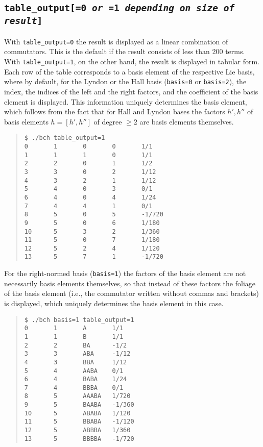 \documentclass[11pt,a4paper]{article}
\begin{document}
\subsection*{\tt table\_output[=0 {\em or} =1 {\em depending on size of result}]}
With \verb|table_output=0| the result is displayed as a linear combination of commutators. 
This is the default if the result consists of less than 200 terms.
With
\verb|table_output=1|, on the other hand, the result is displayed in tabular form.
Each row of the table corresponds to a basis element of the respective Lie basis,
where by default, for the Lyndon or the Hall
basis (\verb|basis=0| or \verb|basis=2|),
the index, the indices of the left and
the right factors, and the coefficient of the basis element is displayed. 
This information uniquely determines the basis element, which follows from the
fact that 
for Hall and Lyndon bases the factors $h', h''$ of basis elements $h=[h',h'']$ of degree $\geq 2$ are
basis elements themselves.
\begin{quote} %
{\small\begin{BVerbatim}
$ ./bch table_output=1
0       1       0       0       1/1
1       1       1       0       1/1
2       2       0       1       1/2
3       3       0       2       1/12
4       3       2       1       1/12
5       4       0       3       0/1
6       4       0       4       1/24
7       4       4       1       0/1
8       5       0       5       -1/720
9       5       0       6       1/180
10      5       3       2       1/360
11      5       0       7       1/180
12      5       2       4       1/120
13      5       7       1       -1/720
\end{BVerbatim}
}\end{quote}
For the right-normed basis (\verb|basis=1|) the factors of
the basis element are not necessarily
basis elements themselves, so that instead of these factors the foliage 
of the basis element (i.e., the commutator written without commas and brackets)
is displayed, which uniquely determines the basis element  in this case.
\begin{quote} %
{\small\begin{BVerbatim}
$ ./bch basis=1 table_output=1
0       1       A       1/1
1       1       B       1/1
2       2       BA      -1/2
3       3       ABA     -1/12
4       3       BBA     1/12
5       4       AABA    0/1
6       4       BABA    1/24
7       4       BBBA    0/1
8       5       AAABA   1/720
9       5       BAABA   -1/360
10      5       ABABA   1/120
11      5       BBABA   -1/120
12      5       ABBBA   1/360
13      5       BBBBA   -1/720
\end{BVerbatim}
}\end{quote}
\end{document}
